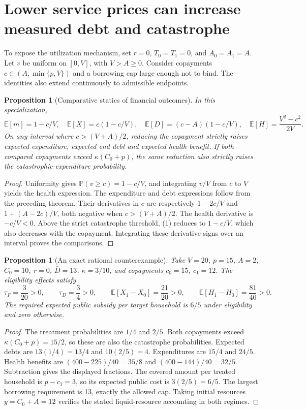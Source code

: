 \documentclass[11pt]{article}
\newtheorem{proposition}[theorem]{Proposition}
\theoremstyle{remark}\newtheorem{remark}[theorem]{Remark}
\newcommand{\E}{\mathbb E}
\newcommand{\Prb}{\mathbb P}
\begin{document}
\section*{Lower service prices can increase measured debt and catastrophe}
To expose the utilization mechanism, set $r=0$, $T_0=T_1=0$, and $A_0=A_1=A$. Let $v$ be uniform on $[0,V]$, with $V>A\ge0$. Consider copayments $c\in(A,\min\{p,V\})$ and a borrowing cap large enough not to bind. The identities also extend continuously to admissible endpoints.

\begin{proposition}[Comparative statics of financial outcomes]
In this specialization,
\[
 \E[m]=1-c/V,\quad \E[X]=c(1-c/V),\quad
 \E[D]=(c-A)(1-c/V),\quad
 \E[H]=\frac{V^2-c^2}{2V}.
\]
On any interval where $c>(V+A)/2$, reducing the copayment strictly raises expected expenditure, expected end debt and expected health benefit. If both compared copayments exceed $\kappa(C_0+p)$, the same reduction also strictly raises the catastrophic-expenditure probability.
\end{proposition}
\begin{proof}
Uniformity gives $\Prb(v\ge c)=1-c/V$, and integrating $v/V$ from $c$ to $V$ yields the health expression. The expenditure and debt expressions follow from the preceding theorem. Their derivatives in $c$ are respectively $1-2c/V$ and $1+(A-2c)/V$, both negative when $c>(V+A)/2$. The health derivative is $-c/V<0$. Above the strict catastrophe threshold, (1) reduces to $1-c/V$, which also decreases with the copayment. Integrating these derivative signs over an interval proves the comparisons.
\end{proof}

\begin{proposition}[An exact rational counterexample]
Take $V=20$, $p=15$, $A=2$, $C_0=10$, $r=0$, $\bar D=13$, $\kappa=3/10$, and copayments $c_0=15$, $c_1=12$. The eligibility effects satisfy
\[
 \tau_F=\frac3{20}>0,\qquad \tau_D=\frac34>0,
 \qquad \E[X_1-X_0]=\frac{21}{20}>0,
 \qquad \E[H_1-H_0]=\frac{81}{40}>0.
\]
The required expected public subsidy per target household is $6/5$ under eligibility and zero otherwise.
\end{proposition}
\begin{proof}
The treatment probabilities are $1/4$ and $2/5$. Both copayments exceed $\kappa(C_0+p)=15/2$, so these are also the catastrophe probabilities. Expected debts are $13(1/4)=13/4$ and $10(2/5)=4$. Expenditures are $15/4$ and $24/5$. Health benefits are $(400-225)/40=35/8$ and $(400-144)/40=32/5$. Subtraction gives the displayed fractions. The covered amount per treated household is $p-c_1=3$, so its expected public cost is $3(2/5)=6/5$. The largest borrowing requirement is 13, exactly the allowed cap. Taking initial resources $y=C_0+A=12$ verifies the stated liquid-resource accounting in both regimes.
\end{proof}
\end{document}
